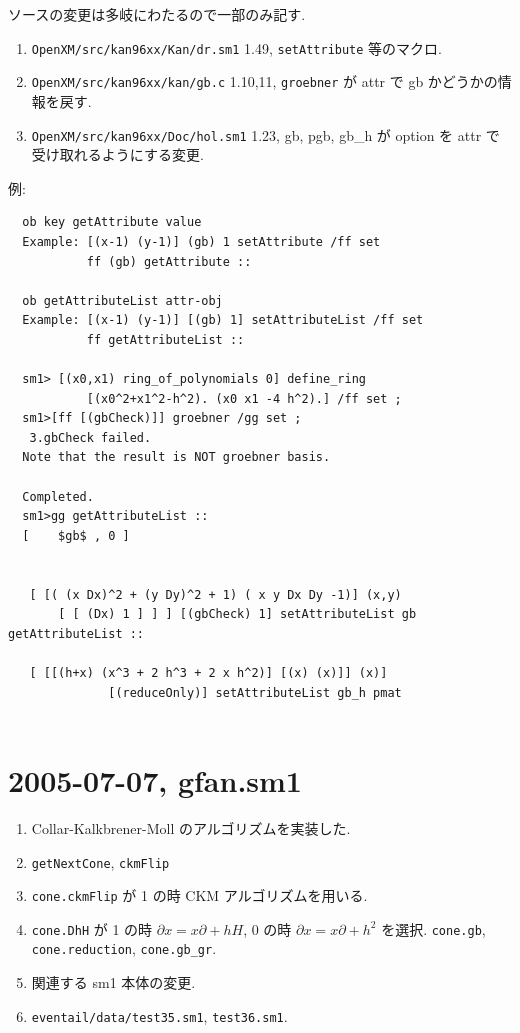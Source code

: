 \documentclass{jarticle}
\begin{document}
ソースの変更は多岐にわたるので一部のみ記す.
\begin{enumerate}
\item {\tt OpenXM/src/kan96xx/Kan/dr.sm1} 1.49,  {\tt setAttribute} 等のマクロ.
\item {\tt OpenXM/src/kan96xx/kan/gb.c} 1.10,11, {\tt groebner} が attr で gb かどうかの情報を戻す.
\item {\tt OpenXM/src/kan96xx/Doc/hol.sm1} 1.23,  gb, pgb, gb\_h が option を attr で受け取れるようにする変更.
\end{enumerate}

例:
{\footnotesize
\begin{verbatim}
  ob key getAttribute value
  Example: [(x-1) (y-1)] (gb) 1 setAttribute /ff set
           ff (gb) getAttribute ::
  
  ob getAttributeList attr-obj
  Example: [(x-1) (y-1)] [(gb) 1] setAttributeList /ff set
           ff getAttributeList ::

  sm1> [(x0,x1) ring_of_polynomials 0] define_ring
           [(x0^2+x1^2-h^2). (x0 x1 -4 h^2).] /ff set ;
  sm1>[ff [(gbCheck)]] groebner /gg set ;
   3.gbCheck failed.
  Note that the result is NOT groebner basis.
  
  Completed.
  sm1>gg getAttributeList ::
  [    $gb$ , 0 ]


   [ [( (x Dx)^2 + (y Dy)^2 + 1) ( x y Dx Dy -1)] (x,y)
       [ [ (Dx) 1 ] ] ] [(gbCheck) 1] setAttributeList gb getAttributeList ::
  
   [ [[(h+x) (x^3 + 2 h^3 + 2 x h^2)] [(x) (x)]] (x)]
              [(reduceOnly)] setAttributeList gb_h pmat


\end{verbatim}
}

\section{2005-07-07, gfan.sm1}
\begin{enumerate}
\item  Collar-Kalkbrener-Moll のアルゴリズムを実装した.
\item {\tt getNextCone}, {\tt ckmFlip}
\item {\tt cone.ckmFlip} が 1 の時 CKM アルゴリズムを用いる.
\item  {\tt cone.DhH} が 1 の時 $\partial x = x \partial + hH$,
0 の時 $\partial x = x \partial + h^2$ を選択.
{\tt cone.gb}, {\tt cone.reduction}, {\tt cone.gb\_gr}.
\item 関連する sm1 本体の変更.
\item {\tt eventail/data/test35.sm1}, {\tt test36.sm1}.
\end{enumerate}
\end{document}
